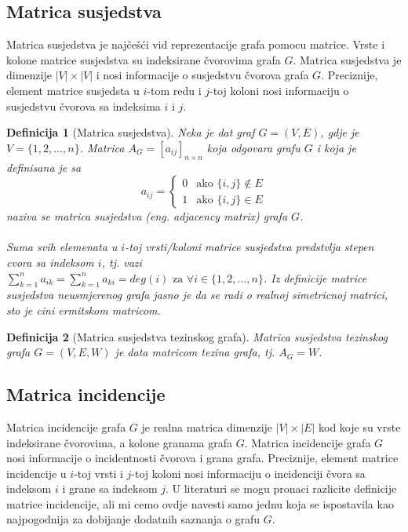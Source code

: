 \documentclass[11pt]{article}
\newtheorem{definition}{Definicija}
\begin{document}
		\subsection{Matrica susjedstva}
		Matrica susjedstva je najčešći vid reprezentacije grafa pomocu matrice. 
		Vrste i kolone matrice susjedstva su indeksirane čvorovima grafa $G$.  
		Matrica susjedstva je dimenzije $|V| \times |V|$ i nosi informacije o susjedstvu čvorova grafa $G$. 
		Preciznije, element matrice susjedsta u $i$-tom redu i $j$-toj koloni nosi informaciju o susjedstvu čvorova sa indeksima $i$ i $j$.
	
			\begin{definition}[Matrica susjedstva] 
			Neka je dat graf $G = (V, E)$, gdje je $V = \{1, 2, \dots, n\}$. Matrica $A_G = [a_{ij}]_{n \times n}$ koja odgovara grafu $G$ i koja je definisana je sa
			 \[
				 a_{ij} =
				 \begin{cases} 
				 0 & \text{ako } \{i, j\} \notin E \\ 
				 1 & \text{ako } \{i, j\} \in E
				 \end{cases}
			 \]
			naziva se matrica susjedstva (eng. adjacency matrix) grafa $G$.
				\paragraph{}
				Suma svih elemenata u $i$-toj vrsti/koloni matrice susjedstva predstvlja stepen cvora sa indeksom $i$,
				tj. vazi $\sum_{k=1}^{n}a_{ik} = \sum_{k=1}^{n}a_{ki} = deg(i) \text{ za } \forall i \in \{1,2, \dots, n\}$.
				Iz definicije matrice susjedstva neusmjerenog grafa jasno je da se radi o realnoj simetricnoj matrici, sto je cini ermitskom matricom. 
			\end{definition}
	
			\begin{definition}[Matrica susjedstva tezinskog grafa] 
			Matrica susjedstva tezinskog grafa  $G = (V, E, W)$ je data matricom tezina grafa, tj. $A_G = W$.
			\end{definition}
	
		\subsection{Matrica incidencije}
		Matrica incidencije grafa $G$ je realna matrica dimenzije $|V| \times |E|$ kod koje su vrste indeksirane čvorovima, a kolone granama grafa $G$.
		Matrica incidencije grafa $G$ nosi informacije o incidentnosti čvorova i grana grafa. 
		Preciznije, element matrice incidencije u $i$-toj vrsti i $j$-toj koloni nosi informaciju o incidenciji čvora sa indeksom $i$ i grane sa indeksom $j$.
		U literaturi se mogu pronaci razlicite definicije matrice incidencije, ali mi cemo ovdje navesti samo jednu koja se ispostavila kao najpogodnija za dobijanje dodatnih saznanja o grafu $G$.
	
\end{document}
